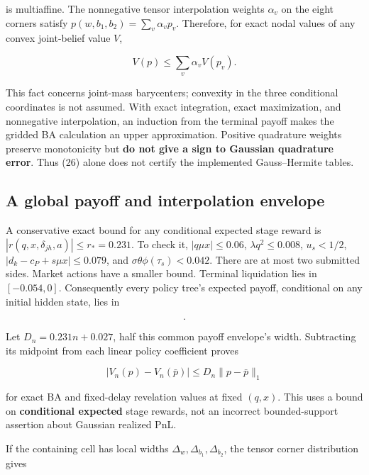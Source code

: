 \documentclass[10pt,a4paper]{article}
\begin{document}
is multiaffine. The nonnegative tensor interpolation weights $\alpha_v$ on
the eight corners satisfy
$p(w,b_1,b_2)=\sum_v\alpha_vp_v$. Therefore, for exact nodal values of
any convex joint-belief value $V$,

\begin{equation}
V(p)\le\sum_v\alpha_vV(p_v).
\tag{26}
\end{equation}

This fact concerns joint-mass barycenters; convexity in the three conditional
coordinates is not assumed. With exact integration, exact maximization, and
nonnegative interpolation, an induction from the terminal payoff makes the
gridded BA calculation an upper approximation. Positive quadrature weights
preserve monotonicity but \textbf{do not give a sign to Gaussian quadrature error}.
Thus (26) alone does not certify the implemented Gauss--Hermite tables.

\subsection{A global payoff and interpolation envelope}

A conservative exact bound for any conditional expected stage reward is
$|r(q,x,\delta_{jh},a)|\le r_*=0.231$. To check it, $|q\mu x|\le0.06$,
$\lambda q^2\le0.008$, $u_s<1/2$,
$|d_k-c_P+s\mu x|\le0.079$, and
$\sigma\theta\phi(\tau_s)<0.042$. There are at most two submitted sides.
Market actions have a smaller bound. Terminal liquidation lies in
$[-0.054,0]$. Consequently every policy tree's expected payoff, conditional
on any initial hidden state, lies in

\begin{equation*}
[-0.231n-0.054,\ 0.231n].
\end{equation*}

Let $D_n=0.231n+0.027$, half this common payoff envelope's width. Subtracting
its midpoint from each linear policy coefficient proves

\begin{equation}
|V_n(p)-V_n(\bar p)|\le D_n\|p-\bar p\|_1
\tag{27}
\end{equation}

for exact BA and fixed-delay revelation values at fixed $(q,x)$.
This uses a bound on \textbf{conditional expected} stage rewards, not an incorrect
bounded-support assertion about Gaussian realized PnL.

If the containing cell has local widths $\Delta_w,\Delta_{b_1},\Delta_{b_2}$, the tensor corner distribution gives
\end{document}
